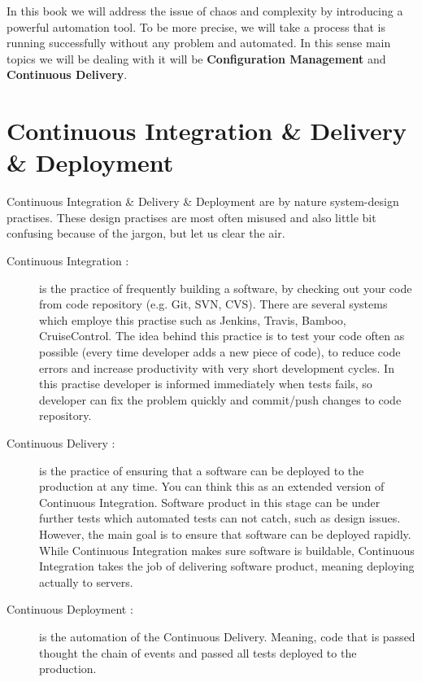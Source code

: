\documentclass[10pt]{book}
\begin{document}
In this book we will address the issue of chaos and complexity by 
introducing a powerful automation tool.  To be more precise, we will take a 
process that is running successfully without any problem and automated. 
In this sense main topics we will be dealing with it will be {\bf Configuration Management} 
and {\bf Continuous Delivery}.

\section{Continuous Integration \& Delivery \& Deployment}
Continuous Integration \& Delivery \& Deployment are by nature system-design practises.
These design practises are most often misused and also little bit confusing 
because of the jargon, but let us clear the air. 


\begin{description}

\item[Continuous Integration :] is the practice of frequently building a software, by 
checking out your code from code repository (e.g. Git, SVN, CVS). There are several systems which employe 
this practise such as Jenkins, Travis, Bamboo, CruiseControl. The idea behind this 
practice is to test your code often as possible (every time developer adds a new piece of code), to reduce code errors and 
increase productivity with very short development cycles. In this practise 
developer is informed immediately when tests fails, so developer can fix the 
problem quickly and commit/push changes to code repository.

\item[Continuous Delivery :] is the practice of ensuring that a software can be 
deployed to the production at any time. You can think this as an extended version of Continuous 
Integration. Software product in this stage can be under further tests which automated tests can not catch, 
such as design issues. However, the main goal is to ensure that software can be deployed rapidly. 
While Continuous Integration makes sure software is buildable, Continuous Integration 
takes the job of delivering software product, meaning deploying actually to 
servers.

\item[Continuous Deployment :] is the automation of the Continuous Delivery. 
Meaning, code that is passed thought the chain of events and passed all tests 
deployed to the production. 

\end{description}
\end{document}
